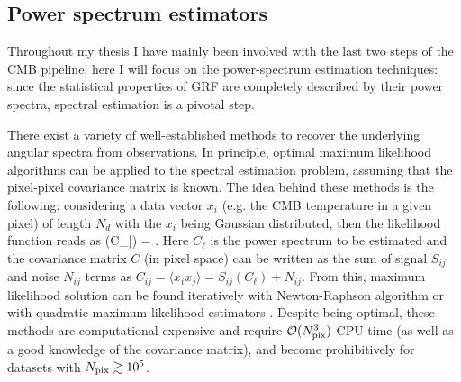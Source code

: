 \subsection{Power spectrum estimators}
\label{sec:ps_est_master}
Throughout  my thesis I have mainly been involved with the last two steps of the \gls{CMB} pipeline, here I will focus on the power-spectrum estimation techniques: since the statistical properties of \gls{GRF} are completely described by their power spectra, spectral estimation is a pivotal step.

There exist a variety of well-established methods to recover the underlying angular spectra from observations. In principle, optimal maximum likelihood algorithms can be applied to the spectral estimation problem, assuming that the pixel-pixel covariance matrix is known. The idea behind these methods is the following: considering a data vector $x_i$ (e.g. the \gls{CMB} temperature in a given pixel) of length $N_d$ with the $x_i$ being Gaussian distributed, then the likelihood function reads as
%
\be
{}(C_{\ell}|) =  {}.
\ee
%
Here $C_{\ell}$ is the power spectrum to be estimated and the covariance matrix $C$ (in pixel space) can be written as the sum of signal $S_{ij}$ and noise $N_{ij}$ terms as $C_{ij}=\langle x_ix_j\rangle=S_{ij}(C_{\ell})+N_{ij}$. From this, maximum likelihood solution can be found iteratively with Newton-Raphson algorithm \citep{Bond1998} or with quadratic maximum likelihood estimators \citep{Tegmark1997}. Despite being optimal, these methods are computational expensive and require $\mathcal{O}(N_{\rm{pix}}^3)$ CPU time (as well as a good knowledge of the covariance matrix), and become prohibitively for datasets with $N_{\rm{pix}} \gtrsim 10^5$. 

